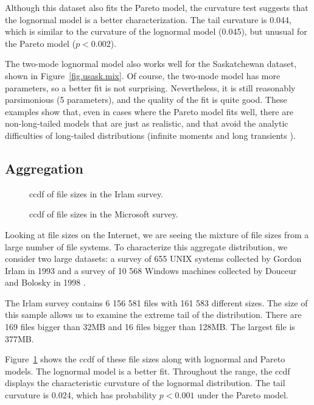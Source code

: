 \documentclass{elsart}
\begin{document}
Although this dataset also fits the Pareto model, the curvature test
suggests that the lognormal model is a better characterization.
The tail curvature is 0.044, which is
similar to the curvature of the lognormal model (0.045), but unusual for
the Pareto model ($p < 0.002$).

The two-mode lognormal model also works well for the Saskatchewan
dataset, shown in Figure~\ref{fig.usask.mix}.  Of course, the two-mode
model has more parameters, so a better fit is not surprising.
Nevertheless, it is still reasonably parsimonious (5 parameters), and
the quality of the fit is quite good.  These examples show that, even
in cases where the Pareto model fits well, there are non-long-tailed
models that are just as realistic, and that avoid the analytic
difficulties of long-tailed distributions (infinite moments and long
transients \cite{fishman03how}).


\subsection {Aggregation}

\begin{figure}[tb]
\centerline{}
\caption{ccdf of file sizes in the Irlam survey.}
\label{fig.irlam}
\end{figure}

\begin{figure}[tb]
\centerline{}
\caption{ccdf of file sizes in the Microsoft survey.}
\label{fig.ms}
\end{figure}

Looking at file sizes on the Internet, we are seeing the mixture of
file sizes from a large number of file systems.
To characterize this aggregate distribution,
we consider two large datasets: a survey of 655 UNIX
systems collected by Gordon Irlam in 1993 \cite{Irlam94} and a survey
of 10 568 Windows machines collected by Douceur and Bolosky in 1998
\cite{DouceurBolosky99}.

The Irlam survey contains 6 156 581 files with 161 583 different
sizes.  The size of this sample allows us to examine the extreme tail
of the distribution.  There are 169 files bigger than 32MB and 16
files bigger than 128MB.  The largest file is 377MB.

Figure~\ref{fig.irlam} shows the ccdf of these file sizes along with
lognormal and Pareto models.  The lognormal model is a better fit.
Throughout the range, the ccdf displays the characteristic curvature
of the lognormal distribution.  The tail curvature is 0.024, which has
probability $p < 0.001$ under the Pareto model.
\end{document}
